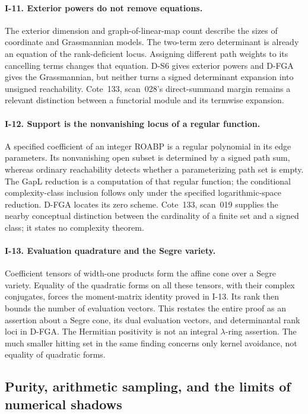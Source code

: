 \paragraph{I-11. Exterior powers do not remove equations.}
The exterior dimension and graph-of-linear-map count describe the sizes of coordinate and Grassmannian models. The two-term zero determinant is already an equation of the rank-deficient locus. Assigning different path weights to its cancelling terms changes that equation. D-S6 gives exterior powers and D-FGA gives the Grassmannian, but neither turns a signed determinant expansion into unsigned reachability. Cote~133, scan~028's direct-summand margin remains a relevant distinction between a functorial module and its termwise expansion.

\paragraph{I-12. Support is the nonvanishing locus of a regular function.}
A specified coefficient of an integer ROABP is a regular polynomial in its edge parameters. Its nonvanishing open subset is determined by a signed path sum, whereas ordinary reachability detects whether a parameterizing path set is empty. The GapL reduction is a computation of that regular function; the conditional complexity-class inclusion follows only under the specified logarithmic-space reduction. D-FGA locates its zero scheme. Cote~133, scan~019 supplies the nearby conceptual distinction between the cardinality of a finite set and a signed class; it states no complexity theorem.

\paragraph{I-13. Evaluation quadrature and the Segre variety.}
Coefficient tensors of width-one products form the affine cone over a Segre variety. Equality of the quadratic forms on all these tensors, with their complex conjugates, forces the moment-matrix identity proved in I-13. Its rank then bounds the number of evaluation vectors. This restates the entire proof as an assertion about a Segre cone, its dual evaluation vectors, and determinantal rank loci in D-FGA. The Hermitian positivity is not an integral $\lambda$-ring assertion. The much smaller hitting set in the same finding concerns only kernel avoidance, not equality of quadratic forms.

\subsection{Purity, arithmetic sampling, and the limits of numerical shadows}

